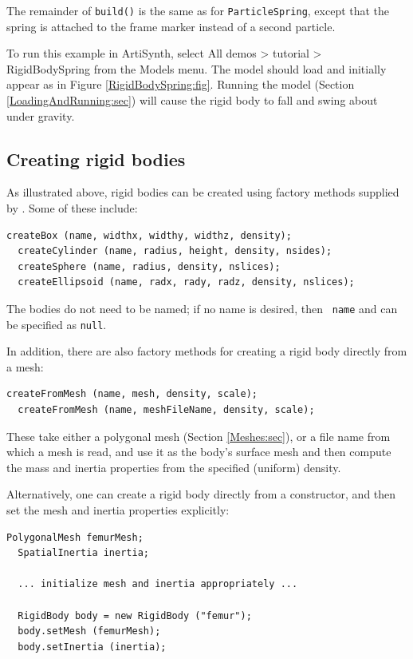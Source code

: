 The remainder of {\tt build()} is the same as for {\tt ParticleSpring},
except that the spring is attached to the frame marker instead of a
second particle.

To run this example in ArtiSynth, select {\sf All demos > tutorial >
RigidBodySpring} from the {\sf Models} menu. The model should load and
initially appear as in Figure \ref{RigidBodySpring:fig}.  Running the
model (Section \ref{LoadingAndRunning:sec}) will cause the rigid body
to fall and swing about under gravity.

\subsection{Creating rigid bodies}

As illustrated above, rigid bodies can be created using factory
methods supplied by .
Some of these include:
%
\begin{lstlisting}[]
  createBox (name, widthx, widthy, widthz, density);
  createCylinder (name, radius, height, density, nsides);
  createSphere (name, radius, density, nslices);
  createEllipsoid (name, radx, rady, radz, density, nslices);
\end{lstlisting}
%
The bodies do not need to be named; if no name is desired, then {\tt
name} and can be specified as {\tt null}.

In addition, there are also
factory methods for creating a rigid body directly from a mesh:
%
\begin{lstlisting}[]
  createFromMesh (name, mesh, density, scale);
  createFromMesh (name, meshFileName, density, scale);
\end{lstlisting}
%
These take either a polygonal mesh (Section \ref{Meshes:sec}), or a
file name from which a mesh is read, and use it as the body's surface
mesh and then compute the mass and inertia properties from the specified
(uniform) density.

Alternatively, one can create a rigid body directly from a
constructor, and then set the mesh and inertia properties explicitly:
%
\begin{lstlisting}[]
  PolygonalMesh femurMesh;
  SpatialInertia inertia;

  ... initialize mesh and inertia appropriately ...

  RigidBody body = new RigidBody ("femur");
  body.setMesh (femurMesh);
  body.setInertia (inertia);
\end{lstlisting}
%

